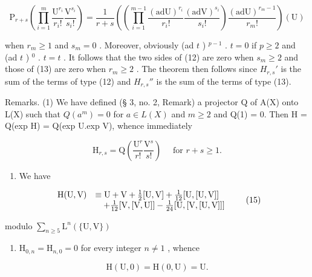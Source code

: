 \[
\mathrm{P} _ {r + s} \left(\prod_ {i = 1} ^ {m} \frac {\mathrm{U} ^ {r _ {i}}}{r _ {i} !} \frac {\mathrm{V} ^ {s _ {i}}}{s _ {i} !}\right) = \frac {1}{r + s} \left(\left(\prod_ {i = 1} ^ {m - 1} \frac {(\mathrm{adU}) ^ {r _ {i}}}{r _ {i} !} \frac {(\mathrm{adV}) ^ {s _ {i}}}{s _ {i} !}\right) \frac {(\mathrm{adU}) ^ {r _ {m} - 1}}{r _ {m} !}\right) (\mathrm{U})\tag{13}
\]

when \(r_m \geqslant 1\) and \(s_m = 0\) . Moreover, obviously (ad \(t\) ) \(^{p-1}\) . \(t = 0\) if \(p \geqslant 2\) and (ad \(t\) ) \(^0\) . \(t = t\) . It follows that the two sides of (12) are zero when \(s_m \geqslant 2\) and those of (13) are zero when \(r_m \geqslant 2\) . The theorem then follows since \(H_{r,s}'\) is the sum of the terms of type (12) and \(H_{r,s}''\) is the sum of the terms of type (13).

Remarks. (1) We have defined (§ 3, no. 2, Remark) a projector Q of A(X) onto L(X) such that \(Q(a^{m}) = 0\) for \(a \in L(X)\) and \(m \geqslant 2\) and Q(1) = 0. Then H = Q(exp H) = Q(exp U.exp V), whence immediately

\[
\mathrm{H} _ {r, s} = \mathrm{Q} \left(\frac {\mathrm{U} ^ {r}}{r !} \frac {\mathrm{V} ^ {s}}{s !}\right) \quad \text { for } r + s \geqslant 1.\tag{14}
\]

\begin{enumerate}
\def\labelenumi{(\arabic{enumi})}
\setcounter{enumi}{1}
\tightlist
\item
  We have
\end{enumerate}

\[
\begin{array}{r l} \mathrm{H(U,V)} & \equiv \mathrm{U+V} + \frac {1}{2} [ \mathrm{U,V} ] + \frac {1}{12} [ \mathrm{U,[U,V]} ] \\ & \quad + \frac {1}{12} [ \mathrm{V,[V,U]} ] - \frac {1}{24} [ \mathrm{U,[V,[U,V]} ] ] \end{array} \tag {15}
\]

modulo \(\sum_{n\geqslant 5}\mathrm{L}^n (\{\mathrm{U},\mathrm{V}\})\)

\begin{enumerate}
\def\labelenumi{(\arabic{enumi})}
\setcounter{enumi}{2}
\tightlist
\item
  \(\mathrm{H}_{0,n} = \mathrm{H}_{n,0} = 0\) for every integer \(n\neq 1\) , whence
\end{enumerate}

\[
\mathrm{H} (\mathrm{U}, 0) = \mathrm{H} (0, \mathrm{U}) = \mathrm{U}.\tag{16}
\]

